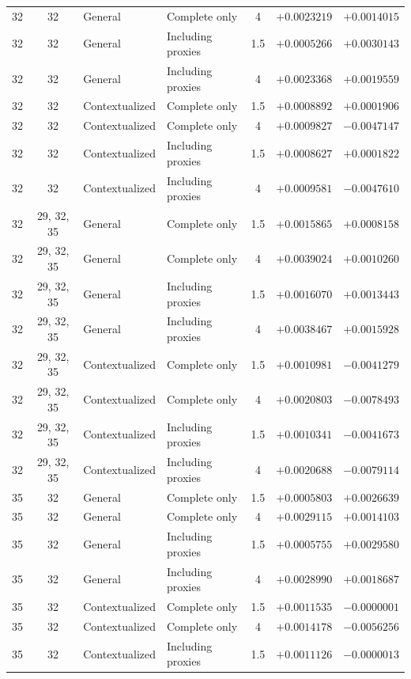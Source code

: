 \begin{table}[p]
\begin{tabular*}{\textwidth}{@{\extracolsep{\fill}}ccllcrr@{}}
32 & 32 & General & Complete only & 4 & $+0.0023219$ & $+0.0014015$ \\
32 & 32 & General & Including proxies & 1.5 & $+0.0005266$ & $+0.0030143$ \\
32 & 32 & General & Including proxies & 4 & $+0.0023368$ & $+0.0019559$ \\
32 & 32 & Contextualized & Complete only & 1.5 & $+0.0008892$ & $+0.0001906$ \\
32 & 32 & Contextualized & Complete only & 4 & $+0.0009827$ & $-0.0047147$ \\
32 & 32 & Contextualized & Including proxies & 1.5 & $+0.0008627$ & $+0.0001822$ \\
32 & 32 & Contextualized & Including proxies & 4 & $+0.0009581$ & $-0.0047610$ \\
32 & 29, 32, 35 & General & Complete only & 1.5 & $+0.0015865$ & $+0.0008158$ \\
32 & 29, 32, 35 & General & Complete only & 4 & $+0.0039024$ & $+0.0010260$ \\
32 & 29, 32, 35 & General & Including proxies & 1.5 & $+0.0016070$ & $+0.0013443$ \\
32 & 29, 32, 35 & General & Including proxies & 4 & $+0.0038467$ & $+0.0015928$ \\
32 & 29, 32, 35 & Contextualized & Complete only & 1.5 & $+0.0010981$ & $-0.0041279$ \\
32 & 29, 32, 35 & Contextualized & Complete only & 4 & $+0.0020803$ & $-0.0078493$ \\
32 & 29, 32, 35 & Contextualized & Including proxies & 1.5 & $+0.0010341$ & $-0.0041673$ \\
32 & 29, 32, 35 & Contextualized & Including proxies & 4 & $+0.0020688$ & $-0.0079114$ \\
\midrule
35 & 32 & General & Complete only & 1.5 & $+0.0005803$ & $+0.0026639$ \\
35 & 32 & General & Complete only & 4 & $+0.0029115$ & $+0.0014103$ \\
35 & 32 & General & Including proxies & 1.5 & $+0.0005755$ & $+0.0029580$ \\
35 & 32 & General & Including proxies & 4 & $+0.0028990$ & $+0.0018687$ \\
35 & 32 & Contextualized & Complete only & 1.5 & $+0.0011535$ & $-0.0000001$ \\
35 & 32 & Contextualized & Complete only & 4 & $+0.0014178$ & $-0.0056256$ \\
35 & 32 & Contextualized & Including proxies & 1.5 & $+0.0011126$ & $-0.0000013$ \\

\end{tabular*}
\end{table}
